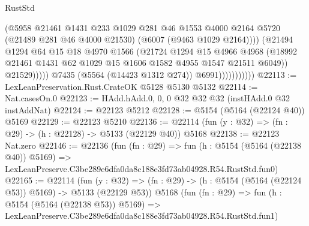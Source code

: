 \begin{lexlean}{RustStd}
\begin{coremodule}
                                    (@5958
                                      @21461
                                      @1431
                                      @233
                                      @1029
                                      @281
                                      @46
                                      @1553
                                      @4000
                                      @2164
                                      @5720
                                      (@21489 @281 @46 @4000 @21530)
                                      (@6007 (@9463 @1029 @2164))))
                                  (@21494
                                    @1294
                                    @64
                                    @15
                                    @18
                                    @4970
                                    @1566
                                    (@21724
                                      @1294
                                      @15
                                      @4966
                                      @4968
                                      (@18992
                                        @21461
                                        @1431
                                        @62
                                        @1029
                                        @15
                                        @1606
                                        @1582
                                        @4955
                                        @1547
                                        @21511
                                        @6049))
                                    @21529)))))
                          @7435
                          (@5564 (@14423 @1312 @274))
                          @6991)))))))))))
@22113 := LexLeanPreservation.Rust.CrateOK @5128 @5130 @5132
@22114 := Nat.casesOn.{0}
@22123 := HAdd.hAdd.{0, 0, 0} @32 @32 @32 (instHAdd.{0} @32 instAddNat)
@22124 := @22123 @5212
@22128 := @5154 (@5164 (@22124 @40)) @5169
@22129 := @22123 @5210
@22136 := @22114 (fun (y : @32) => (fn : @29) -> (h : @22128) -> @5133 (@22129 @40)) @5168
@22138 := @22123 Nat.zero
@22146 := @22136
    (fun (fn : @29) =>
    fun (h : @5154 (@5164 (@22138 @40)) @5169) =>
    LexLeanPreserve.C3be289e6dfa0da8c188e3fd73ab04928.R54.RustStd.fun0)
@22165 := @22114
    (fun (y : @32) => (fn : @29) -> (h : @5154 (@5164 (@22124 @53)) @5169) -> @5133 (@22129 @53))
    @5168
    (fun (fn : @29) =>
    fun (h : @5154 (@5164 (@22138 @53)) @5169) =>
    LexLeanPreserve.C3be289e6dfa0da8c188e3fd73ab04928.R54.RustStd.fun1)

\end{coremodule}
\end{lexlean}
